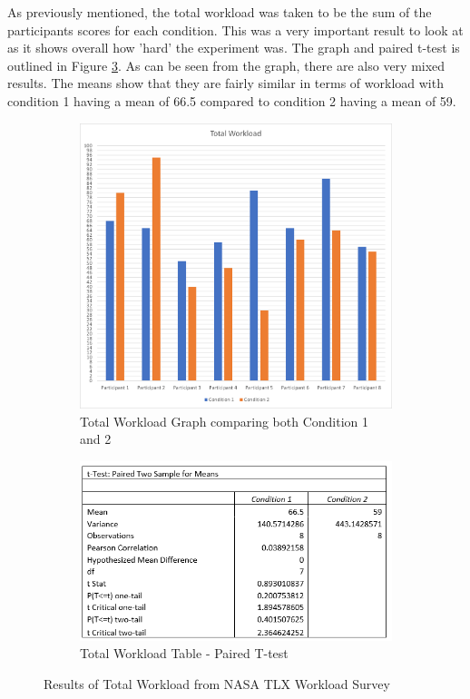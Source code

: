 \documentclass{l4proj}
\begin{document}
As previously mentioned, the total workload was taken to be the sum of the participants scores for each condition. This was a very important result to look at as it shows overall how 'hard' the experiment was. The graph and paired t-test is outlined in Figure \ref{fig:workload}. As can be seen from the graph, there are also very mixed results. The means show that they are fairly similar in terms of workload with condition 1 having a mean of 66.5 compared to condition 2 having a mean of 59. 

\begin{figure}[!htb]
    \centering
    \begin{subfigure}[b]{0.45\textwidth}
        \includegraphics[scale = 0.5]{images/TotalWorkloadGraph.png}
        \caption{Total Workload Graph comparing both Condition 1 and 2}
        \label{fig:syn1}
    \end{subfigure}
    
    \begin{subfigure}[b]{0.45\textwidth}
        \includegraphics[scale = 0.6]{images/TotalWorkloadTable.png}
        \caption{Total Workload Table - Paired T-test}
        \label{fig:syn2}
    \end{subfigure}
    \caption{Results of Total Workload from NASA TLX Workload Survey}
    \label{fig:workload}
\end{figure}
\end{document}
